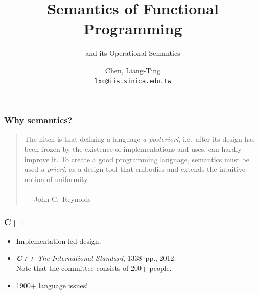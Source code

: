 \title{Semantics of Functional Programming}
\subtitle{\PCF{} and its Operational Semantics}
\author[L.-T. Chen]{Chen, Liang-Ting\\
  \href{mailto:lxc@iis.sinica.edu.tw}{\texttt{lxc@iis.sinica.edu.tw}}}


\setcounter{framenumber}{-1}

\frame{\maketitle}

\begin{frame}[c]
  \frametitle{Why semantics?}
  \begin{quotation}
    The hitch is that defining a language \emph{a posteriori}, i.e.\ after its
    design has been frozen by the existence of implementations and uses, can
    hardly improve it.  To create a good programming language, semantics must
    be used \emph{a priori}, as a design tool that embodies and extends the
    intuitive notion of uniformity. \\~\\
    \hfill --- \textrm{John C.\ Reynolds}
  \end{quotation}
\end{frame}

\begin{frame}[c]
  \frametitle{\protect\textbf{C++}}
  \begin{itemize}
      \item Implementation-led design.
      \item \emph{\textbf{C++} The International Standard},
        \alert{1338~pp.}, 2012. \\
        Note that the committee consists of \alert{200+ people}.
      \item \alert{1900+} language issues!
  \end{itemize}
  \begin{center}
  \end{center}
\end{frame}

